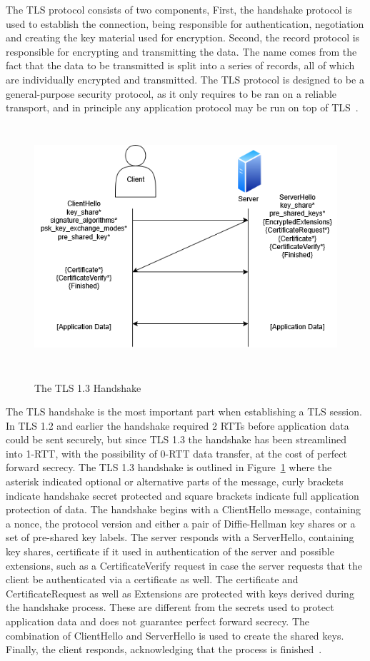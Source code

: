 \documentclass[english, 12pt, a4paper, elec, utf8, a-2b, online]{aaltothesis}
\begin{document}
The TLS protocol consists of two components, First, the handshake protocol is used to
establish the connection, being responsible for authentication, negotiation and creating
the key material used for encryption. Second, the record protocol is responsible
for encrypting and transmitting the data. The name comes from the fact that the data
to be transmitted is split into a series of records, all of which are individually
encrypted and transmitted. The TLS protocol is designed to be a general-purpose
security protocol, as it only requires to be ran on a reliable transport, and in
principle any application protocol may be run on top of TLS~\cite{rfc8446}.

\begin{figure}[h]
	\centering
	\includegraphics[alt={Diagram of TLS handshake between a client and a server}, height=9cm]{./images/tls_handshake.png}
	\caption{The TLS 1.3 Handshake}
	\label{fig:tls_handshake}
\end{figure}
The TLS handshake is the most important part when establishing a TLS session. In
TLS 1.2 and earlier the handshake required 2 RTTs before application data could be sent
securely, but since TLS 1.3 the handshake has been streamlined into 1-RTT, with the
possibility of 0-RTT data transfer, at the cost of perfect forward secrecy. The TLS 1.3
handshake is outlined in Figure~\ref{fig:tls_handshake} where the asterisk indicated optional
or alternative parts of the message, curly brackets indicate handshake secret protected and
square brackets indicate full application protection of data. The handshake begins with a ClientHello message,
containing a nonce, the protocol version and
either a pair of Diffie-Hellman key shares or a set of pre-shared key labels. The server responds
with a ServerHello, containing key shares, certificate if it used in authentication of the server
and possible extensions, such as a CertificateVerify request in case the server requests that the client
be authenticated via a certificate as well. The certificate and CertificateRequest as
well as Extensions are protected with keys derived during the handshake process. These
are different from the secrets used to protect application data and does not guarantee
perfect forward secrecy. The combination of ClientHello and ServerHello is used to
create the shared keys. Finally, the client responds, acknowledging that the process is finished~\cite{rfc8446}.
\end{document}

